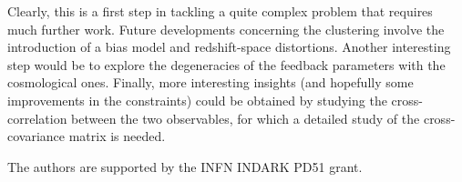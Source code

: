 \documentclass[a4paper,11pt]{article}
\begin{document}
Clearly, this is a first step in tackling a quite complex problem that requires much further work. Future developments concerning the clustering involve the introduction of a bias model and redshift-space distortions. Another interesting step would be to explore the degeneracies of the feedback parameters with the cosmological ones. Finally, more interesting insights (and hopefully some improvements in the constraints) could be obtained by studying the cross-correlation between the two observables, for which a detailed study of the cross-covariance matrix is needed.

\acknowledgments
The authors are supported by the INFN INDARK PD51 grant.




\end{document}
